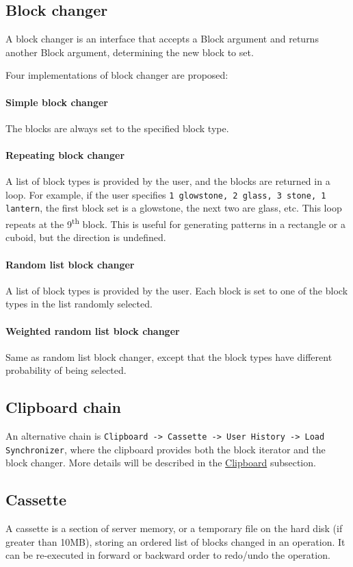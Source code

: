 \documentclass{report}
\def \sup #1{\textsuperscript{#1}}
\begin{document}
			\subsection{Block changer}
				A block changer is an interface that accepts a Block argument and returns another Block argument,
				determining the new block to set.

				Four implementations of block changer are proposed:
				\paragraph{Simple block changer} The blocks are always set to the specified block type.
				\paragraph{Repeating block changer} A list of block types is provided by the user, and the blocks are
				returned in a loop. For example, if the user specifies \texttt{1 glowstone, 2 glass, 3 stone, 1 lantern},
				the first block set is a glowstone, the next two are glass, etc. This loop repeats at the 9\sup{th}
				block. This is useful for generating patterns in a rectangle or a cuboid, but the direction is undefined.
				\paragraph{Random list block changer} A list of block types is provided by the user. Each block is set
				to one of the block types in the list randomly selected.
				\paragraph{Weighted random list block changer} Same as random list block changer, except that the block
				types have different probability of being selected.

			\subsection{Clipboard chain}
				An alternative chain is \texttt{Clipboard -> Cassette -> User History -> Load Synchronizer}, where the
				clipboard provides both the block iterator and the block changer. More details will be described in the
				\hyperref[sec:clipboard]{Clipboard} subsection.

			\subsection{Cassette}
				A cassette is a section of server memory, or a temporary file on the hard disk (if greater than 10MB),
				storing an ordered list of blocks changed in an operation. It can be re-executed in forward or backward
				order to redo/undo the operation.
\end{document}

